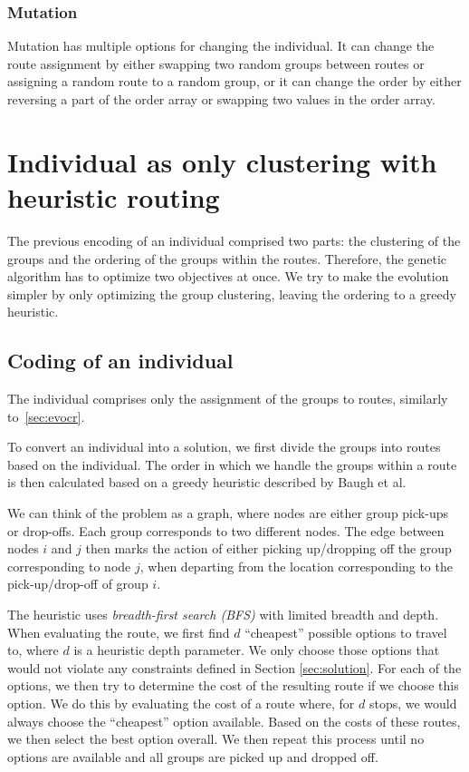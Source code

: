 \subsubsection{Mutation}

Mutation has multiple options for changing the individual. It can change the route assignment by either swapping two random groups between routes or assigning a random route to a random group, or it can change the order by either reversing a part of the order array or swapping two values in the order array.

\section{Individual as only clustering with heuristic routing}\label{sec:evoh}

The previous encoding of an individual comprised two parts: the clustering of the groups and the ordering of the groups within the routes. Therefore, the genetic algorithm has to optimize two objectives at once. We try to make the evolution simpler by only optimizing the group clustering, leaving the ordering to a greedy heuristic.

\subsection{Coding of an individual}

The individual comprises only the assignment of the groups to routes, similarly to~\ref{sec:evocr}.

To convert an individual into a solution, we first divide the groups into routes based on the individual. The order in which we handle the groups within a route is then calculated based on a greedy heuristic described by Baugh et al. \cite{Baugh1998INTRACTABILITYOT}

We can think of the problem as a graph, where nodes are either group pick-ups or drop-offs. Each group corresponds to two different nodes. The edge between nodes $i$ and $j$ then marks the action of either picking up/dropping off the group corresponding to node $j$, when departing from the location corresponding to the pick-up/drop-off of group $i$.

The heuristic uses \textit{breadth-first search (BFS)} with limited breadth and depth. When evaluating the route, we first find $d$ ``cheapest'' possible options to travel to, where $d$ is a heuristic depth parameter. We only choose those options that would not violate any constraints defined in Section \ref{sec:solution}. For each of the options, we then try to determine the cost of the resulting route if we choose this option. We do this by evaluating the cost of a route where, for $d$ stops, we would always choose the ``cheapest'' option available. Based on the costs of these routes, we then select the best option overall. We then repeat this process until no options are available and all groups are picked up and dropped off.

